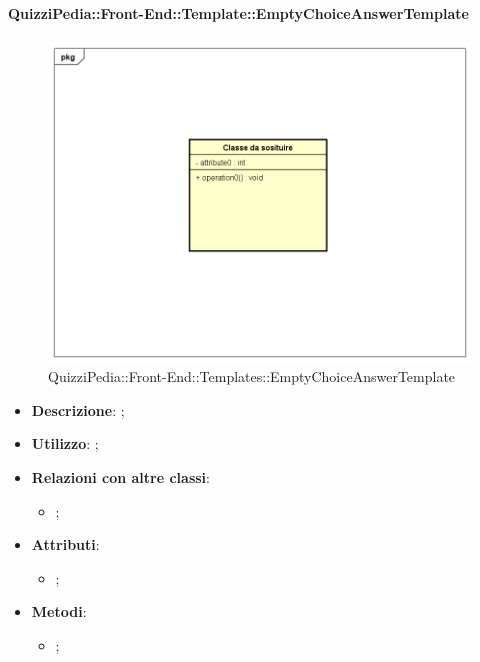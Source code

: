 		\paragraph{QuizziPedia::Front-End::Template::EmptyChoiceAnswerTemplate}
		
				\label{QuizziPedia::Front-End::Templates::EmptyChoiceAnswerTemplate}

				\begin{figure}[h]
					\centering
					\includegraphics[scale=0.5,keepaspectratio]{UML/Classi/Front-End/Temporanea.png}
					\caption{QuizziPedia::Front-End::Templates::EmptyChoiceAnswerTemplate}
				\end{figure}
		
			\begin{itemize}
				\item \textbf{Descrizione}: ;
				\item \textbf{Utilizzo}: ;
				\item \textbf{Relazioni con altre classi}: 
				\begin{itemize}
					\item ;
				\end{itemize}
				\item \textbf{Attributi}: 
				\begin{itemize}
					\item ;
				\end{itemize}
				\item \textbf{Metodi}: 
				\begin{itemize}
					\item ;
				\end{itemize}
			\end{itemize}
		
